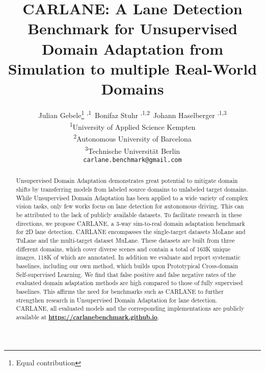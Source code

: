 \documentclass{article}
\title{CARLANE: A Lane Detection Benchmark for Unsupervised Domain Adaptation from Simulation to multiple Real-World Domains}
\author{Julian Gebele\thanks{Equal contribution} \textsuperscript{ ,1}\, 
	Bonifaz Stuhr\footnotemark[1] \textsuperscript{ ,1,2}\, 
	Johann Haselberger\footnotemark[1] \textsuperscript{ ,1,3}\\
	\textsuperscript{1}University of Applied Science Kempten\\
	\textsuperscript{2}Autonomous University of Barcelona\\
	\textsuperscript{3}Technische Universität Berlin\\
\texttt{carlane.benchmark@gmail.com}  
}
\begin{document}
	
	\maketitle
	
	\begin{abstract}
		Unsupervised Domain Adaptation demonstrates great potential to mitigate domain shifts by transferring models from labeled source domains to unlabeled target domains. While Unsupervised Domain Adaptation has been applied to a wide variety of complex vision tasks, only few works focus on lane detection for autonomous driving. This can be attributed to the lack of publicly available datasets. To facilitate research in these directions, we propose CARLANE, a 3-way sim-to-real domain adaptation benchmark for 2D lane detection. CARLANE encompasses the single-target datasets MoLane and TuLane and the multi-target dataset MuLane. These datasets are built from three different domains, which cover diverse scenes and contain a total of 163K unique images, 118K of which are annotated. In addition we evaluate and report systematic baselines, including our own method, which builds upon Prototypical Cross-domain Self-supervised Learning. We find that false positive and false negative rates of the evaluated domain adaptation methods are high compared to those of fully supervised baselines. This affirms the need for benchmarks such as CARLANE to further strengthen research in Unsupervised Domain Adaptation for lane detection. CARLANE, all evaluated models and the corresponding implementations are publicly available at \href{https://carlanebenchmark.github.io}{\textbf{https://carlanebenchmark.github.io}}.
	\end{abstract}
	
\end{document}
